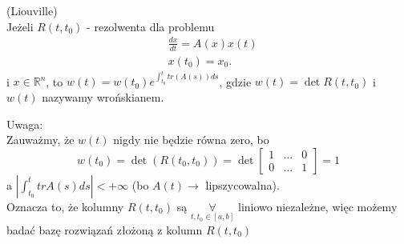 \documentclass[../main.tex]{subfiles}
\begin{document}
\begin{tw}
    (Liouville)\\
    Jeżeli $R(t,t_0)$ - rezolwenta dla problemu
    \begin{align*}
        &\frac{dx}{dt} = A(x)x(t)\\
        &x(t_0) = x_0
    .\end{align*}
    i $x\in \mathbb{R}^n$, to $w(t) = w(t_0)e^{\int_{t_0}^t tr(A(s))ds}$, gdzie $w(t) = \det R(t,t_0)$ i $w(t)$ nazywamy wrońskianem.\\
\end{tw}
    Uwaga:\\
        Zauważmy, że $w(t)$ nigdy nie będzie równa zero, bo
        \[
            w(t_0) = \det(R(t_0,t_0)) = \det \begin{bmatrix} 1&\ldots&0\\0&\ldots&1 \end{bmatrix} = 1
            \]
            a $\left| \int_{t_0}^t tr A(s)ds \right| < +\infty$ (bo $A(t)\to$ lipszycowalna).\\
        Oznacza to, że kolumny $R(t,t_0)$ są $\underset{t,t_0\in [a,b]}{\forall} $ liniowo niezależne, więc możemy badać bazę rozwiązań złożoną z kolumn $R(t,t_0)$
\end{document}
